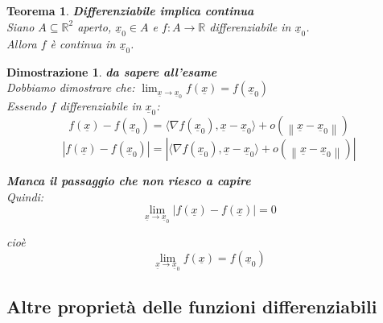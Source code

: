 \documentclass{scrreprt}
\newtheorem{teorema}{Teorema}
\newenvironment{thm}{\begin{mdframed}[backgroundcolor=Ivory2]\begin{teorema}}{\end{teorema}\end{mdframed}}
\newtheorem{demnstrn}{Dimostrazione}
\newenvironment{dimostrazione}{\begin{mdframed}[backgroundcolor=LightCyan1]\begin{demnstrn}}{\end{demnstrn}\end{mdframed}}
\begin{document}
\begin{thm} \textbf{Differenziabile implica continua}\\
	Siano $A \subseteq \mathbb{R}^2$ aperto, $\underline{x}_0 \in A$ e $f: A \to \mathbb{R}$ differenziabile in $\underline{x}_0$.\\
	Allora $f$ è continua in $\underline{x}_0$.
\end{thm}
\begin{dimostrazione}
	\emph{\textbf{da sapere all'esame}}\\
	Dobbiamo dimostrare che: $\lim_{\underline{x} \to \underline{x}_0} f(\underline{x}) = f(\underline{x}_0)$\\
	Essendo $f$ differenziabile in $\underline{x}_0$:\\
	\begin{equation}
		f(\underline{x}) - f(\underline{x}_0) = \langle \nabla f(\underline{x}_0), \underline{x} - \underline{x}_0 \rangle + o(\left\lVert \underline{x} - \underline{x}_0\right\rVert )
	\end{equation}
	\begin{equation}
		\left\lvert f(\underline{x}) - f(\underline{x}_0) \right\rvert = \left\lvert \langle \nabla f(\underline{x}_0), \underline{x} - \underline{x}_0 \rangle + o(\left\lVert \underline{x} - \underline{x}_0\right\rVert )\right\rvert 
	\end{equation}

	\textbf{Manca il passaggio che non riesco a capire}\\

	Quindi:
	\begin{equation}
		\lim_{\underline{x} \to \underline{x}_0} \left\lvert f(\underline{x}) - f(\underline{x})\right\rvert = 0
	\end{equation}

	cioè
	\begin{equation}
		\lim_{\underline{x} \to \underline{x}_0} f(\underline{x}) = f(\underline{x}_0)
	\end{equation}
\end{dimostrazione}

\subsection{Altre proprietà delle funzioni differenziabili}
\end{document}
